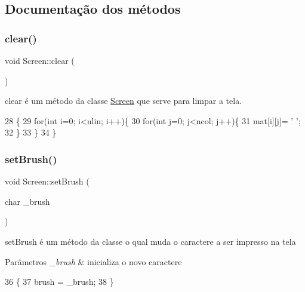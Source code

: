 \subsection{Documentação dos métodos}
\mbox{\label{class_screen_a35e74266b2a04e37b354ceff7a5f1031}} 
\subsubsection{\texorpdfstring{clear()}{clear()}}
{\footnotesize\ttfamily void Screen\+::clear (\begin{DoxyParamCaption}{ }\end{DoxyParamCaption})}



clear é um método da classe \hyperlink{class_screen}{Screen} que serve para limpar a tela. 


\begin{DoxyCode}
28                   \{
29     \textcolor{keywordflow}{for}(\textcolor{keywordtype}{int} i=0; i<nlin; i++)\{
30         \textcolor{keywordflow}{for}(\textcolor{keywordtype}{int} j=0; j<ncol; j++)\{
31             mat[i][j]= \textcolor{charliteral}{' '};
32         \}
33     \}
34 \}
\end{DoxyCode}
\mbox{\label{class_screen_aebc4eb6cb5acf15a0f04c1494622ab23}} 
\subsubsection{\texorpdfstring{set\+Brush()}{setBrush()}}
{\footnotesize\ttfamily void Screen\+::set\+Brush (\begin{DoxyParamCaption}\item[{char}]{\+\_\+brush }\end{DoxyParamCaption})}



set\+Brush é um método da classe o qual muda o caractere a ser impresso na tela 


\begin{DoxyParams}{Parâmetros}
{\em \+\_\+brush} & inicializa o novo caractere \\
\hline
\end{DoxyParams}

\begin{DoxyCode}
36                                 \{
37     brush = \_brush;
38 \}
\end{DoxyCode}
\mbox{\label{class_screen_ae6bea81c57a22d226507c3c26fa95ee0}} 

